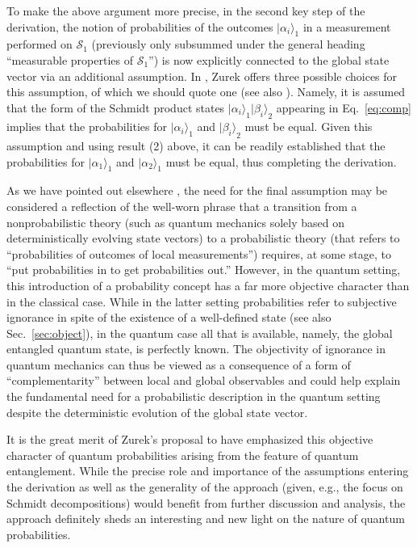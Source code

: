 \documentclass[12pt,aps,floatfix,amsmath,amssymb,showpacs,nofootinbib]{revtex4-2}
\newcommand{\ket}[1]{\ensuremath{|{#1\rangle}}}
\begin{document}
To make the above argument more precise, in the second key step of the
derivation, the notion of probabilities of the outcomes
$\ket{\alpha_i}_1$ in a measurement performed on $\mathcal{S}_1$
(previously only subsummed under the general heading ``measurable
properties of $\mathcal{S}_1$'') is now explicitly connected to the
global state vector via an additional assumption. In
\cite{Zurek:2004:yb}, Zurek offers three possible choices for
this assumption, of which we should quote one (see also
\cite{Barnum:2003:yb}). Namely, it is assumed that the form of
the Schmidt product states $\ket{\alpha_i}_1\ket{\beta_i}_2$ appearing
in Eq.~\eqref{eq:comp} implies that the probabilities for
$\ket{\alpha_i}_1$ and $\ket{\beta_i}_2$ must be equal. Given this
assumption and using result (2) above, it can be readily established
\cite{Schlosshauer:2003:ms,Schlosshauer:2003:tv,Zurek:2004:yb} that
the probabilities for $\ket{\alpha_1}_1$ and $\ket{\alpha_2}_1$ must
be equal, thus completing the derivation.

As we have pointed out elsewhere \cite{Schlosshauer:2003:ms}, the need
for the final assumption may be considered a reflection of the
well-worn phrase that a transition from a nonprobabilistic theory
(such as quantum mechanics solely based on deterministically evolving
state vectors) to a probabilistic theory (that refers to
``probabilities of outcomes of local measurements'') requires, at some
stage, to ``put probabilities in to get probabilities out.'' However,
in the quantum setting, this introduction of a probability concept has
a far more objective character than in the classical case. While in
the latter setting probabilities refer to subjective ignorance in
spite of the existence of a well-defined state (see also
Sec.~\ref{sec:object}), in the quantum case all that is available,
namely, the global entangled quantum state, is perfectly known. The
objectivity of ignorance in quantum mechanics can thus be viewed as a
consequence of a form of ``complementarity'' between local and global
observables \cite{Zurek:2004:yb} and could help explain the
fundamental need for a probabilistic description in the quantum
setting despite the deterministic evolution of the global state
vector.

It is the great merit of Zurek's proposal to have emphasized this
objective character of quantum probabilities arising from the feature
of quantum entanglement. While the precise role and importance of the
assumptions entering the derivation as well as the generality of the
approach (given, e.g., the focus on Schmidt decompositions) would
benefit from further discussion and analysis, the approach definitely
sheds an interesting and new light on the nature of quantum
probabilities.
\end{document}
